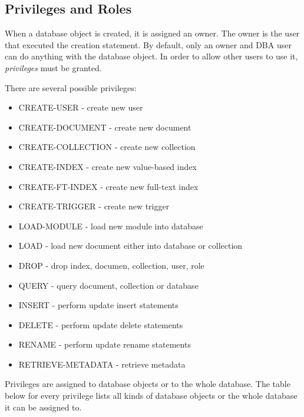 \documentclass[a4paper,12pt]{article}
\newenvironment{citemize}
{\begin{itemize}
  \setlength{\itemsep}{0pt}
  \setlength{\parskip}{0pt}
  \setlength{\parsep}{0pt}}
{\end{itemize}}
\begin{document}
\subsection{Privileges and Roles}
\label{roles}

When a database object is created, it is assigned an owner. The owner is the
user that executed the creation statement. By default, only an owner and DBA
user can do anything with the database object. In order to allow other users
to use it, \emph{privileges} must be granted.

There are several possible privileges:

\begin{citemize}
\item CREATE-USER - create new user
\item CREATE-DOCUMENT - create new document
\item CREATE-COLLECTION - create new collection
\item CREATE-INDEX - create new value-based index
\item CREATE-FT-INDEX - create new full-text index
\item CREATE-TRIGGER - create new trigger
\item LOAD-MODULE - load new module into database
\item LOAD - load new document either into database or collection
\item DROP - drop index, documen, collection, user, role
\item QUERY - query document, collection or database
\item INSERT - perform update insert statements
\item DELETE - perform update delete statements
\item RENAME - perform update rename statements
\item RETRIEVE-METADATA - retrieve metadata
\end{citemize}

Privileges are assigned to database objects or to the whole database. The table
below for every privilege lists all kinds of database objects or the whole
database it can be assigned to.

\medskip
\end{document}
